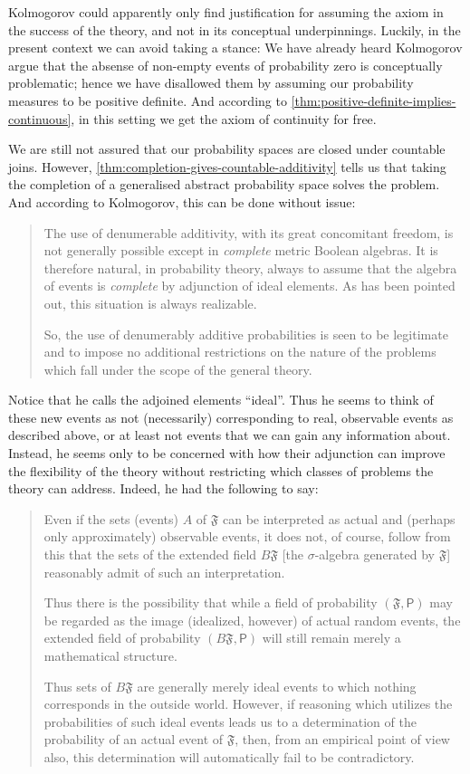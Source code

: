 \documentclass[article, a4paper, 11pt, oneside]{memoir}
\numberwithin{equation}{chapter}
\begin{document}
Kolmogorov could apparently only find justification for assuming the axiom in the success of the theory, and not in its conceptual underpinnings. Luckily, in the present context we can avoid taking a stance: We have already heard Kolmogorov argue that the absense of non-empty events of probability zero is conceptually problematic; hence we have disallowed them by assuming our probability measures to be positive definite. And according to \cref{thm:positive-definite-implies-continuous}, in this setting we get the axiom of continuity for free.

We are still not assured that our probability spaces are closed under countable joins. However, \cref{thm:completion-gives-countable-additivity} tells us that taking the completion of a generalised abstract probability space solves the problem. And according to Kolmogorov, this can be done without issue:
%
\newlength{\oldparindent}
\setlength{\oldparindent}{\parindent}
\blockquote[\cite{kolmogorov1995}]{\setlength{\parskip}{0pt}\setlength{\parindent}{\oldparindent}
    The use of denumerable additivity, with its great concomitant freedom, is not generally possible except in \emph{complete} metric Boolean algebras. It is therefore natural, in probability theory, always to assume that the algebra of events is \emph{complete} by adjunction of ideal elements. As has been pointed out, this situation is always realizable.

    So, the use of denumerably additive probabilities is seen to be legitimate and to impose no additional restrictions on the nature of the problems which fall under the scope of the general theory.
}
%
Notice that he calls the adjoined elements \enquote{ideal}. Thus he seems to think of these new events as not (necessarily) corresponding to real, observable events as described above, or at least not events that we can gain any information about. Instead, he seems only to be concerned with how their adjunction can improve the flexibility of the theory without restricting which classes of problems the theory can address. Indeed, he had the following to say:
%
\blockquote[\cite{kolmogorov1956}]{\setlength{\parskip}{0pt}\setlength{\parindent}{\oldparindent}
    Even if the sets (events) $A$ of $\mathfrak{F}$ can be interpreted as actual and (perhaps only approximately) observable events, it does not, of course, follow from this that the sets of the extended field $B\mathfrak{F}$ [the $\sigma$-algebra generated by $\mathfrak{F}$] reasonably admit of such an interpretation.

    Thus there is the possibility that while a field of probability $(\mathfrak{F}, \mathsf{P})$ may be regarded as the image (idealized, however) of actual random events, the extended field of probability $(B\mathfrak{F}, \mathsf{P})$ will still remain merely a mathematical structure.
    
    Thus sets of $B\mathfrak{F}$ are generally merely ideal events to which nothing corresponds in the outside world. However, if reasoning which utilizes the probabilities of such ideal events leads us to a determination of the probability of an actual event of $\mathfrak{F}$, then, from an empirical point of view also, this determination will automatically fail to be contradictory.
}
\end{document}
